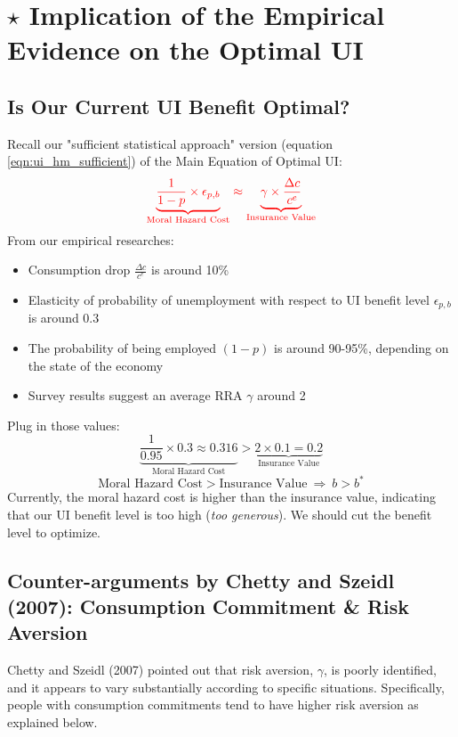 \section{$\star$ Implication of the Empirical Evidence on the Optimal UI}
    
    \subsection{Is Our Current UI Benefit Optimal?}
        Recall our "sufficient statistical approach" version (equation \ref{eqn:ui_hm_sufficient}) of the Main Equation of Optimal UI:
        \begin{equation*}
        \color{red}
            \underbrace{\frac{1}{1-p}\times{\epsilon_{p,b}}}_{\text{Moral\ Hazard\ Cost}} \approx \underbrace{\gamma \times \frac{\Delta c}{c^e}}_{\text{Insurance\ Value}}
        \end{equation*}
        From our empirical researches:
        \begin{itemize}
            \item Consumption drop $\frac{\Delta c}{c^e}$ is around 10\%
            \item Elasticity of probability of unemployment with respect to UI benefit level $\epsilon_{p,b}$ is around 0.3
            \item The probability of being employed $(1-p)$ is around 90-95\%, depending on the state of the economy
            \item Survey results suggest an average RRA $\gamma$ around 2
        \end{itemize}
        Plug in those values:
        $$\underbrace{\frac{1}{0.95}\times{0.3} \approx 0.316}_{\text{Moral\ Hazard\ Cost}} > \underbrace{2 \times 0.1 = 0.2}_{\text{Insurance\ Value}}$$
        $$\text{Moral\ Hazard\ Cost} > \text{Insurance\ Value}\ \Rightarrow\ b>b^*$$
        Currently, the moral hazard cost is higher than the insurance value, indicating that our UI benefit level is too high (\emph{too generous}). We should cut the benefit level to optimize.
        
    \subsection{Counter-arguments by Chetty and Szeidl (2007): Consumption Commitment \& Risk Aversion}
        Chetty and Szeidl (2007) pointed out that risk aversion, $\gamma$, is poorly identified, and it appears to vary substantially according to specific situations. Specifically, people with consumption commitments tend to have higher risk aversion as explained below.
